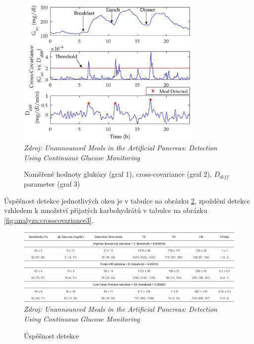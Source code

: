 \begin{figure}[H]
\caption{Naměřené hodnoty glukózy (graf 1), cross-covariance (graf 2), $D_{diff}$ parameter (graf 3)}
\label{fig:analyza:crosscovariance1}
\centering
\includegraphics[width=0.8\textwidth]{img/analyzaCHO/crosscovariance1.jpg}\\
\textit{Zdroj: Unannounced Meals in the Artificial Pancreas: Detection Using Continuous Glucose Monitoring \citep{analyzaCHO.CrossCovariance}}
\end{figure}

Úspěšnost detekce jednotlivých oken je v tabulce na obrázku \ref{fig:analyza:crosscovariance2}, zpoždění detekce vzhledem k množství přijatých karbohydrátů v tabulce na obrázku \ref{fig:analyza:crosscovariance3}.

\begin{figure}[H]
\caption{Úspěšnost detekce}
\label{fig:analyza:crosscovariance2}
\includegraphics[width=1\textwidth]{img/analyzaCHO/crosscovariance2.png}\\
\textit{Zdroj: Unannounced Meals in the Artificial Pancreas: Detection Using Continuous Glucose Monitoring \citep{analyzaCHO.CrossCovariance}}
\end{figure}

